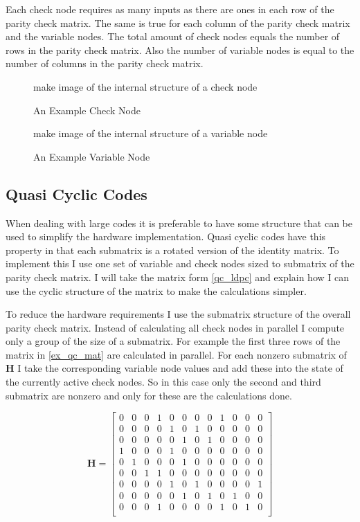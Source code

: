 Each check node requires as many inputs as there are ones in each row of the parity check matrix. The same is true for each column of the parity check matrix and the variable nodes. The total amount of check nodes equals the number of rows in the parity check matrix. Also the number of variable nodes is equal to the number of columns in the parity check matrix.

\begin{figure}
    make image of the internal structure of a check node
    \centering
    \caption{An Example Check Node}
\end{figure}

\begin{figure}
    make image of the internal structure of a variable node
    \centering
    \caption{An Example Variable Node}
\end{figure}

\subsection{Quasi Cyclic Codes}
When dealing with large codes it is preferable to have some structure that can be used to simplify the hardware implementation. Quasi cyclic codes have this property in that each submatrix is a rotated  version of the identity matrix. To implement this I use one set of variable and check nodes sized to submatrix of the parity check matrix. I will take the matrix form \cref{qc_ldpc} and explain how I can use the cyclic structure of the matrix to make the calculations simpler.

To reduce the hardware requirements I use the submatrix structure of the overall parity check matrix. Instead of calculating all check nodes in parallel I compute only a group of the size of a submatrix. For example the first three rows of the matrix in \cref{ex_qc_mat} are calculated in parallel. For each nonzero submatrix of $\bm{H}$ I take the corresponding variable node values and add these into the state of the currently active check nodes. So in this case only the second and third submatrix are nonzero and only for these are the calculations done. 

\begin{equation}
	\bm{H} = \left[\begin{matrix}
		0 & 0 & 0 & 1 & 0 & 0 & 0 & 0 & 1 & 0 & 0 & 0 \\
		0 & 0 & 0 & 0 & 1 & 0 & 1 & 0 & 0 & 0 & 0 & 0 \\
		0 & 0 & 0 & 0 & 0 & 1 & 0 & 1 & 0 & 0 & 0 & 0 \\
		1 & 0 & 0 & 0 & 1 & 0 & 0 & 0 & 0 & 0 & 0 & 0 \\
		0 & 1 & 0 & 0 & 0 & 1 & 0 & 0 & 0 & 0 & 0 & 0 \\
		0 & 0 & 1 & 1 & 0 & 0 & 0 & 0 & 0 & 0 & 0 & 0 \\
		0 & 0 & 0 & 0 & 1 & 0 & 1 & 0 & 0 & 0 & 0 & 1 \\
		0 & 0 & 0 & 0 & 0 & 1 & 0 & 1 & 0 & 1 & 0 & 0 \\
		0 & 0 & 0 & 1 & 0 & 0 & 0 & 0 & 1 & 0 & 1 & 0 \\
    \end{matrix}\right] \label{ex_qc_mat}
\end{equation}

